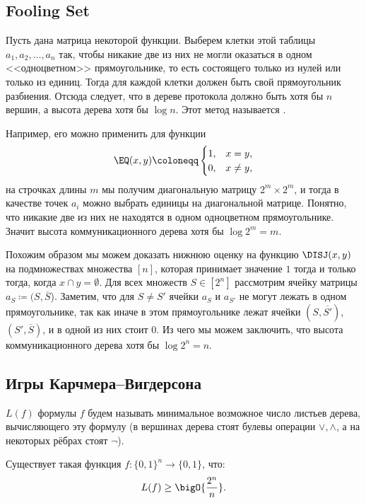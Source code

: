 \subsection{Fooling Set}

Пусть дана матрица некоторой функции. Выберем клетки этой таблицы $a_1, a_2, \ldots, a_n$ так, чтобы
никакие две из них не могли оказаться в одном <<одноцветном>> прямоугольнике, то есть состоящего только
из нулей или только из единиц. Тогда для каждой клетки должен быть свой прямоугольник разбиения. Отсюда
следует, что в дереве протокола должно быть хотя бы $n$ вершин, а высота дерева хотя бы $\log n$. Этот
метод называется .  

Например, его можно применить для функции
$$
    \EQ(x, y) \coloneqq
    \begin{cases}
        1, & x = y,\\
        0, & x \neq y,
    \end{cases}
$$
на строчках длины $m$ мы получим диагональную матрицу $2^m \times 2^m$, и тогда в качестве точек $a_i$
можно выбрать единицы на диагональной матрице. Понятно, что никакие две из них не находятся в одном
одноцветном прямоугольнике. Значит высота коммуникационного дерева хотя бы $\log 2^m = m$.

Похожим образом мы можем доказать нижнюю оценку на функцию $\DISJ(x, y)$ на подмножествах множества
$[n]$, которая принимает значение $1$ тогда и только тогда, когда $ x \cap y = \emptyset$. Для всех
множеств $S \in [2^n]$ рассмотрим ячейку матрицы $a_S \coloneqq (S, \overline{S}$). Заметим, что для $S
\neq S'$ ячейки $a_S$ и $a_{S'}$ не могут лежать в одном прямоугольнике, так как иначе в этом
прямоугольнике лежат ячейки $(S, \overline{S'})$, $(S', \overline{S})$, и в одной из них стоит $0$. Из
чего мы можем заключить, что высота коммуникационного дерева хотя бы $\log 2^n = n$.  


\subsection{Игры Карчмера--Вигдерсона}

\begin{definition}
     $L(f)$ формулы $f$ будем называть минимальное возможное число листьев
    дерева, вычисляющего эту формулу (в вершинах дерева стоят булевы операции $\vee, \wedge$, а на
    некоторых рёбрах стоят $\neg $).
\end{definition}

\begin{theorem}[Шеннон]
    Существует такая функция $f\colon \{0, 1\}^n \to \{0, 1\}$, что:
    $$
        L(f) \ge \bigO{\frac{2^n}{n}}.
    $$
\end{theorem}

